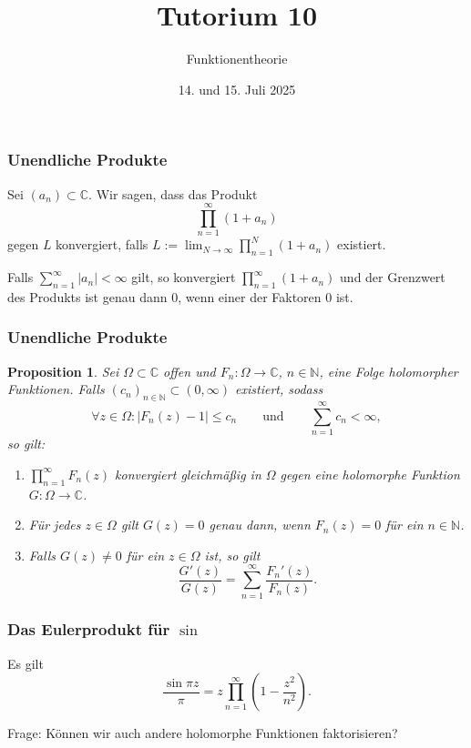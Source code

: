 \documentclass[10pt]{beamer}
\author[\url{https://fdf-uni.github.io/ft}]{}
\title{Tutorium 10}
\subtitle{\texorpdfstring{Funktionentheorie\vspace*{-1.5cm}}{Funktionentheorie}}
\date{14. und 15. Juli 2025}
\newtheorem{proposition}{Proposition}
\begin{document}
\begin{frame}
	\titlepage
\end{frame}
\begin{frame}
	\frametitle{Unendliche Produkte}
	\pause
	\begin{definition}
		Sei $(a_n) \subset \mathbb{C}$.
		Wir sagen, dass das Produkt
		\[
			\prod_{n=1}^{\infty} (1 + a_n)
		\]
		gegen $L$ konvergiert, falls $L := \lim_{N \to \infty} \prod_{n = 1}^{N} (1 + a_n)$ existiert.
	\end{definition}
	\pause
	\begin{lemma}
		Falls $\sum_{n = 1}^{\infty} \lvert a_n \rvert < \infty$ gilt, so konvergiert $\prod_{n = 1}^{\infty} (1 + a_n)$ und der Grenzwert des Produkts ist genau dann $0$, wenn einer der Faktoren $0$ ist.
	\end{lemma}
\end{frame}
\begin{frame}
	\frametitle{Unendliche Produkte}
	\begin{proposition}
		Sei $\Omega \subset \mathbb{C}$ offen und $F_n \colon \Omega \to \mathbb{C}$, $n \in \mathbb{N}$, eine Folge holomorpher Funktionen.
		Falls $(c_n)_{n \in \mathbb{N}} \subset (0, \infty)$ existiert, sodass
		\[
			\forall z \in \Omega : \lvert F_n(z) - 1 \rvert \le c_n \qquad \text{und} \qquad \sum_{n = 1}^{\infty} c_n < \infty,
		\]
		so gilt:
		\begin{enumerate}
			\pause
			\item $\prod_{n = 1}^{\infty} F_n(z)$ konvergiert \emph{gleichmäßig} in $\Omega$ gegen eine holomorphe Funktion $G \colon \Omega \to \mathbb{C}$.
			      \pause
			\item Für jedes $z \in \Omega$ gilt $G(z) = 0$ genau dann, wenn $F_n(z) = 0$ für ein $n \in \mathbb{N}$.
			      \pause
			\item Falls $G(z) \neq 0$ für ein $z \in \Omega$ ist, so gilt
			      \[
				      \frac{G'(z)}{G(z)} = \sum_{n = 1}^{\infty} \frac{F_n'(z)}{F_n(z)}.
			      \]
		\end{enumerate}
	\end{proposition}
\end{frame}
\begin{frame}
	\frametitle{Das Eulerprodukt für $\sin$}
	\begin{theorem}[Euler]
		Es gilt
		\[
			\frac{\sin \pi z}{\pi} = z \prod_{n=1}^{\infty} \left(1 - \frac{z^2}{n^2} \right).
		\]
	\end{theorem}
	\pause
	Frage: Können wir auch andere holomorphe Funktionen \glqq faktorisieren\grqq?
\end{frame}
\end{document}

